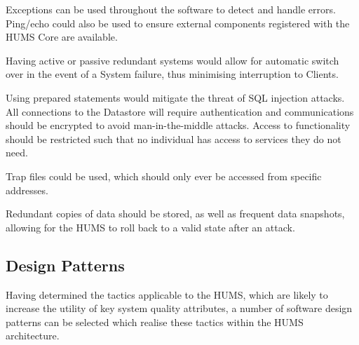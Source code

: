 \documentclass[10pt,a4paper]{article}
\begin{document}
\begin{description}
\begin{description}[noitemsep]
	\item[Fault Detection] Exceptions can be used throughout the software to detect and handle errors. Ping/echo could also be used to ensure external components registered with the HUMS Core are available.
	\item[Fault Recovery] Having active or passive redundant systems would allow for automatic switch over in the event of a System failure, thus minimising interruption to Clients.
	\end{description}
\item[Security] \hfill
	\begin{description}[noitemsep]
	\item[Resisting Attacks] Using prepared statements would mitigate the threat of SQL injection attacks. All connections to the Datastore will require authentication and communications should be encrypted to avoid man-in-the-middle attacks. Access to functionality should be restricted such that no individual has access to services they do not need. 
	\item[Detecting Attacks] Trap files could be used, which should only ever be accessed from specific addresses.
	\item[Recovering From Attacks] Redundant copies of data should be stored, as well as frequent data snapshots, allowing for the HUMS to roll back to a valid state after an attack.
	\end{description}
\end{description}

\subsection{Design Patterns}
Having determined the tactics applicable to the HUMS, which are likely to increase the utility of key system quality attributes, a number of software design patterns can be selected which realise these tactics within the HUMS architecture.
\end{document}
